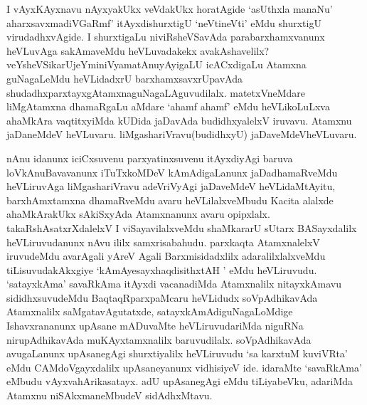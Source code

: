 
\begin{artha}
I vAyxKAyxnavu nAyxyakUkx veVdakUkx horatAgide `asUthxla manaNu' aharxsavxmadiVGaRmf' itAyxdishurxtigU  `neVtineVti' eMdu shurxtigU virudadhxvAgide. I shurxtigaLu niviRsheVSavAda parabarxhamxvanunx heVLuvAga sakAmaveMdu heVLuvadakekx avakAshavelilx? veYsheVSikarUjeYminiVyamatAnuyAyigaLU icACxdigaLu Atamxna guNagaLeMdu heVLidadxrU barxhamxsavxrUpavAda shudadhxparxtayxgAtamxnaguNagaLAguvudilalx. matetxVneMdare liMgAtamxna dhamaRgaLu aMdare `ahamf ahamf' eMdu heVLikoLuLxva ahaMkAra vaqtitxyiMda kUDida jaDavAda budidhxyalelxV iruvavu. Atamxnu jaDaneMdeV heVLuvaru. liMgashariVravu(budidhxyU) jaDaveMdeVheVLuvaru.
\end{artha}

\begin{artha}
nAnu idanunx iciCxsuvenu parxyatinxsuvenu itAyxdiyAgi baruva loVkAnuBavavanunx iTuTxkoMDeV kAmAdigaLanunx jaDadhamaRveMdu heVLiruvAga liMgashariVravu adeVriVyAgi jaDaveMdeV heVLidaMtAyitu, barxhAmxtamxna dhamaRveMdu avaru heVLilalxveMbudu Kacita alalxde ahaMkArakUkx sAkiSxyAda Atamxnanunx avaru opipxlalx. takaRshAsatxrXdalelxV I viSayavilalxveMdu shaMkararU sUtarx BASayxdalilx heVLiruvudanunx nAvu ililx samxrisabahudu. parxkaqta AtamxnalelxV iruvudeMdu avarAgali yAreV Agali Barxmisidadxlilx adaralilxlalxveMdu tiLisuvudakAkxgiye `kAmAye\s sayxhaqdisithxtAH ' eMdu heVLiruvudu. `satayxkAma' savaRkAma itAyxdi vacanadiMda Atamxnalilx nitayxkAmavu sididhxsuvudeMdu BaqtaqRparxpaMcaru heVLidudx soVpAdhikavAda Atamxnalilx saMgatavAgutatxde, satayxkAmAdiguNagaLoMdige Ishavxrananunx upAsane mADuvaMte heVLiruvudariMda niguRNa nirupAdhikavAda muKAyxtamxnalilx baruvudilalx. soVpAdhikavAda avugaLanunx upAsanegAgi shurxtiyalilx heVLiruvudu `sa karxtuM kuviVRta' eMdu CAMdoVgayxdalilx upAsaneyanunx vidhisiyeV ide. idaraMte `savaRkAma' eMbudu vAyxvahArikasatayx. adU upAsanegAgi eMdu tiLiyabeVku, adariMda Atamxnu niSAkxmaneMbudeV sidAdhxMtavu.
\end{artha}

